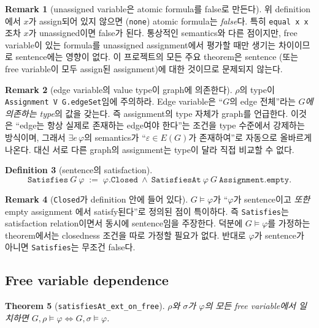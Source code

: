 \documentclass[11pt]{article}
\theoremstyle{definition}
\newtheorem{definition}{Definition}[section]
\newtheorem{remark}[definition]{Remark}
\theoremstyle{plain}
\newtheorem{theorem}[definition]{Theorem}
\newcommand{\lean}[1]{\texttt{#1}}
\begin{document}
\begin{remark}[unassigned variable은 atomic formula를 false로 만든다]
\label{basics:rem:atomsem}
위 definition에서 $x$가 assign되어 있지 않으면 (\lean{none}) atomic formula는
\emph{false}다. 특히 \lean{equal x x}조차 $x$가 unassigned이면 false가 된다.
통상적인 semantics와 다른 점이지만, free variable이 있는 formula를 unassigned
assignment에서 평가할 때만 생기는 차이이므로 sentence에는 영향이 없다.
이 프로젝트의 모든 주요 theorem은 sentence (또는 free variable이 모두 assign된
assignment)에 대한 것이므로 문제되지 않는다.
\end{remark}

\begin{remark}[edge variable의 value type이 graph에 의존한다]
\label{basics:rem:edgesort}
$\rho$의 type이 \lean{Assignment V G.edgeSet}임에 주의하라. Edge variable은
``$G$의 edge 전체''라는 \emph{$G$에 의존하는 type}의 값을 갖는다. 즉
assignment의 type 자체가 graph를 언급한다. 이것은 ``edge는 항상 실제로
존재하는 edge여야 한다''는 조건을 type 수준에서 강제하는 방식이며, 그래서
$\exists e\, \varphi$의 semantics가 ``$\varepsilon \in E(G)$가 존재하여''로
자동으로 올바르게 나온다. 대신 서로 다른 graph의 assignment는 type이 달라
직접 비교할 수 없다.
\end{remark}

\begin{definition}[sentence의 satisfaction]
\label{basics:def:satisfies}
\[
  \lean{Satisfies}\ G\ \varphi \;:=\; \varphi.\lean{Closed} \ \land\
  \lean{SatisfiesAt}\ \varphi\ G\ \lean{Assignment.empty}.
\]
\end{definition}

\begin{remark}[\lean{Closed}가 definition 안에 들어 있다]
$G \models \varphi$가 ``$\varphi$가 sentence이고 \emph{또한} empty assignment
에서 satisfy된다''로 정의된 점이 특이하다. 즉 \lean{Satisfies}는 satisfaction
relation이면서 동시에 sentence임을 주장한다. 덕분에 $G \models \varphi$를
가정하는 theorem에서는 closedness 조건을 따로 가정할 필요가 없다. 반대로
$\varphi$가 sentence가 아니면 \lean{Satisfies}는 무조건 false다.
\end{remark}

\subsection{Free variable dependence}

\begin{theorem}[\lean{satisfiesAt\_ext\_on\_free}]
\label{basics:thm:extonfree}
$\rho$와 $\sigma$가 $\varphi$의 모든 free variable에서 일치하면
$G,\rho \models \varphi \iff G,\sigma \models \varphi$.
\end{theorem}
\end{document}
